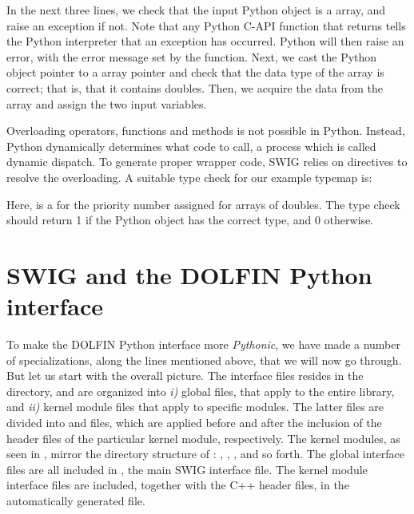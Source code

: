 In the next three lines, we check that the input Python object is a \numpy
array, and raise an exception if not.  Note that any Python C-API function
that returns  tells the Python interpreter that an exception
has occurred. Python will then raise an error, with the error message set
by the  function. Next, we cast the Python object
pointer to a \numpy array pointer and check that the data type of the
\numpy array is correct; that is, that it contains doubles. Then, we
acquire the data from the \numpy array and assign the two input variables.

Overloading operators, functions and methods is not possible in Python.
Instead, Python dynamically determines what code to call, a process
which is called dynamic dispatch.  To generate proper wrapper code,
SWIG relies on  directives to resolve the overloading.
A suitable type check for our example typemap is:\vspace*{1.5pt}

\vspace*{3pt}

\noindent Here,  is a  for the
priority number assigned for arrays of doubles. The type check should
return 1 if the Python object  has the correct type, and
0 otherwise.

\vspace*{6pt}
\section{SWIG and the DOLFIN Python interface}

To make the DOLFIN Python interface more \textit{Pythonic}, we have made a number of
specializations, along the lines mentioned above, that we will now
go through. But let us start with the overall picture.  The interface
files resides in the  directory, and are organized into
\textit{i)} global files, that apply to the entire \dolfin library,
and \textit{ii)} kernel module files that apply to specific \dolfin
modules. The latter files are divided into 
and  files, which are applied before and after
the inclusion of the header files of the particular kernel module,
respectively.  The kernel modules, as seen in ,
mirror the directory structure of \dolfin: , ,
,  and so forth. The global interface files are all
included in , the main SWIG interface file. The kernel
module interface files are included, together with the C++ header files,
in the automatically generated  file.

